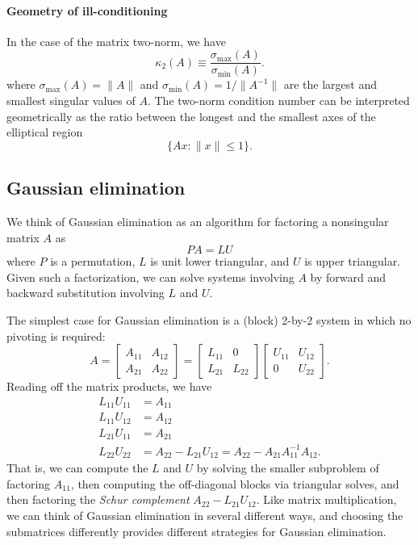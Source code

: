 \documentclass[12pt, leqno]{article}
\begin{document}
\paragraph{Geometry of ill-conditioning}
In the case of the matrix two-norm, we have
\[
  \kappa_2(A) \equiv \frac{\sigma_{\max}(A)}{\sigma_{\min}(A)}.
\]
where $\sigma_{\max}(A) = \|A\|$ and $\sigma_{\min}(A) = 1/\|A^{-1}\|$
are the largest and smallest singular values of $A$.
The two-norm condition number can be interpreted geometrically as the
ratio between the longest and the smallest axes of the elliptical region
\[
  \{Ax : \|x\| \leq 1\}.
\]

\subsection{Gaussian elimination}

We think of Gaussian elimination as an algorithm for factoring a
nonsingular matrix $A$ as
\[
  PA = LU
\]
where $P$ is a permutation, $L$ is unit lower triangular, and $U$ is
upper triangular.  Given such a factorization, we can solve systems
involving $A$ by forward and backward substitution involving $L$
and $U$.

The simplest case for Gaussian elimination is a (block) 2-by-2 system
in which no pivoting is required:
\[
A = \begin{bmatrix} A_{11} & A_{12} \\ A_{21} & A_{22} \end{bmatrix}
  = \begin{bmatrix} L_{11} & 0 \\ L_{21} & L_{22} \end{bmatrix}
    \begin{bmatrix} U_{11} & U_{12} \\ 0 & U_{22} \end{bmatrix}.
\]
Reading off the matrix products, we have
\begin{align*}
  L_{11} U_{11} &= A_{11} \\
  L_{11} U_{12} &= A_{12} \\
  L_{21} U_{11} &= A_{21} \\
  L_{22} U_{22} &= A_{22} - L_{21} U_{12}
               = A_{22} - A_{21} A_{11}^{-1} A_{12}.
\end{align*}
That is, we can compute the $L$ and $U$ by solving the smaller
subproblem of factoring $A_{11}$, then computing the off-diagonal
blocks via triangular solves, and then factoring the {\em Schur
  complement} $A_{22}-L_{21} U_{12}$.  Like matrix multiplication, we
can think of Gaussian elimination in several different ways, and
choosing the submatrices differently provides different strategies for
Gaussian elimination.
\end{document}
